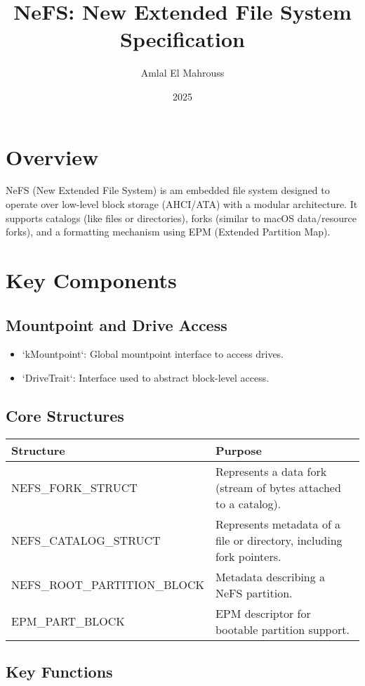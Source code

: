 \documentclass{article}
\title{NeFS: New Extended File System Specification}
\author{Amlal El Mahrouss}
\date{2025}
\begin{document}
\maketitle

\section{Overview}
NeFS (New Extended File System) is am embedded file system designed to operate over low-level block storage (AHCI/ATA) with a modular architecture. It supports catalogs (like files or directories), forks (similar to macOS data/resource forks), and a formatting mechanism using EPM (Extended Partition Map).

\section{Key Components}

\subsection*{Mountpoint and Drive Access}
\begin{itemize}
  \item `kMountpoint`: Global mountpoint interface to access drives.
  \item `DriveTrait`: Interface used to abstract block-level access.
\end{itemize}

\subsection*{Core Structures}
\begin{longtable}{|l|p{11cm}|}
\hline
\textbf{Structure} & \textbf{Purpose} \\
\hline
NEFS\_FORK\_STRUCT & Represents a data fork (stream of bytes attached to a catalog). \\
\hline
NEFS\_CATALOG\_STRUCT & Represents metadata of a file or directory, including fork pointers. \\
\hline
NEFS\_ROOT\_PARTITION\_BLOCK & Metadata describing a NeFS partition. \\
\hline
EPM\_PART\_BLOCK & EPM descriptor for bootable partition support. \\
\hline
\end{longtable}

\subsection*{Key Functions}
\end{document}
